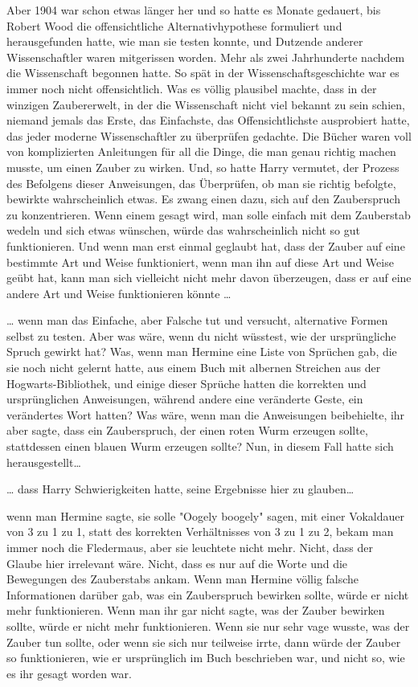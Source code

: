 {Aber 1904 war schon etwas länger her und so hatte es Monate gedauert, bis Robert Wood die offensichtliche Alternativhypothese formuliert und herausgefunden hatte, wie man sie testen konnte, und Dutzende anderer Wissenschaftler waren mitgerissen worden. Mehr als zwei Jahrhunderte nachdem die Wissenschaft begonnen hatte. So spät in der Wissenschaftsgeschichte war es immer noch nicht offensichtlich. Was es völlig plausibel machte, dass in der winzigen Zaubererwelt, in der die Wissenschaft nicht viel bekannt zu sein schien, niemand jemals das Erste, das Einfachste, das Offensichtlichste ausprobiert hatte, das jeder moderne Wissenschaftler zu überprüfen gedachte. Die Bücher waren voll von komplizierten Anleitungen für all die Dinge, die man genau richtig machen musste, um einen Zauber zu wirken. Und, so hatte Harry vermutet, der Prozess des Befolgens dieser Anweisungen, das Überprüfen, ob man sie richtig befolgte, bewirkte wahrscheinlich etwas. Es zwang einen dazu, sich auf den Zauberspruch zu konzentrieren. Wenn einem gesagt wird, man solle einfach mit dem Zauberstab wedeln und sich etwas wünschen, würde das wahrscheinlich nicht so gut funktionieren. Und wenn man erst einmal geglaubt hat, dass der Zauber auf eine bestimmte Art und Weise funktioniert, wenn man ihn auf diese Art und Weise geübt hat, kann man sich vielleicht nicht mehr davon überzeugen, dass er auf eine andere Art und Weise funktionieren könnte …

… wenn man das Einfache, aber Falsche tut und versucht, alternative Formen selbst zu testen. Aber was wäre, wenn du nicht wüsstest, wie der ursprüngliche Spruch gewirkt hat? Was, wenn man Hermine eine Liste von Sprüchen gab, die sie noch nicht gelernt hatte, aus einem Buch mit albernen Streichen aus der Hogwarts-Bibliothek, und einige dieser Sprüche hatten die korrekten und ursprünglichen Anweisungen, während andere eine veränderte Geste, ein verändertes Wort hatten? Was wäre, wenn man die Anweisungen beibehielte, ihr aber sagte, dass ein Zauberspruch, der einen roten Wurm erzeugen sollte, stattdessen einen blauen Wurm erzeugen sollte? Nun, in diesem Fall hatte sich herausgestellt…

… dass Harry Schwierigkeiten hatte, seine Ergebnisse hier zu glauben…

wenn man Hermine sagte, sie solle "Oogely boogely" sagen, mit einer Vokaldauer von 3 zu 1 zu 1, statt des korrekten Verhältnisses von 3 zu 1 zu 2, bekam man immer noch die Fledermaus, aber sie leuchtete nicht mehr. Nicht, dass der Glaube hier irrelevant wäre. Nicht, dass es nur auf die Worte und die Bewegungen des Zauberstabs ankam. Wenn man Hermine völlig falsche Informationen darüber gab, was ein Zauberspruch bewirken sollte, würde er nicht mehr funktionieren. Wenn man ihr gar nicht sagte, was der Zauber bewirken sollte, würde er nicht mehr funktionieren. Wenn sie nur sehr vage wusste, was der Zauber tun sollte, oder wenn sie sich nur teilweise irrte, dann würde der Zauber so funktionieren, wie er ursprünglich im Buch beschrieben war, und nicht so, wie es ihr gesagt worden war.

}
